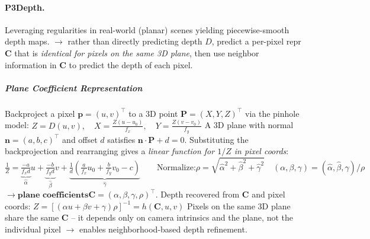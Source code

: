\documentclass{article}
\begin{document}
\paragraph{P3Depth.}
Leveraging regularities in real-world (planar) scenes yielding piecewise-smooth depth maps. $\rightarrow$ rather than directly predicting depth $D$, predict a per-pixel repr $\mathbf{C}$ that is \textit{identical for pixels on the same 3D plane}, then use neighbor information in $\mathbf{C}$ to predict the depth of each pixel.

\subparagraph{Plane Coefficient Representation}
Backproject a pixel $\mathbf{p} = (u,v)^\top$ to a 3D point $\mathbf{P} = (X,Y,Z)^\top$ via the pinhole model:
$Z = D(u,v), \quad X = \tfrac{Z(u-u_0)}{f_x}, \quad Y = \tfrac{Z(v-v_0)}{f_y}$
A 3D plane with normal $\mathbf{n} = (a,b,c)^\top$ and offset $d$ satisfies $\mathbf{n}\cdot\mathbf{P} + d = 0$. Substituting the backprojection and rearranging gives a \textit{linear function for $1/Z$ in pixel coords}:
$$\tfrac{1}{Z} = \underbrace{\tfrac{-a}{f_x d}}_{\hat\alpha} u + \underbrace{\tfrac{-b}{f_y d}}_{\hat\beta} v + \underbrace{\tfrac{1}{d}\!\left(\tfrac{a}{f_x}u_0 + \tfrac{b}{f_y}v_0 - c\right)}_{\hat\gamma}\qquad \text{Normalize:} \rho = \sqrt{\hat\alpha^2 + \hat\beta^2 + \hat\gamma^2}\quad (\alpha,\beta,\gamma) = (\hat\alpha, \hat\beta, \hat\gamma)/\rho$$ 
$\rightarrow \textbf{plane coefficients} \mathbf{C} = (\alpha, \beta, \gamma, \rho)^\top$.
Depth recovered from $\mathbf{C}$ and pixel coords:
$Z = [(\alpha u + \beta v + \gamma)\rho]^{-1} = h(\mathbf{C}, u, v)$
Pixels on the same 3D plane share the same $\mathbf{C}$ -- it depends only on camera intrinsics and the plane, not the individual pixel $\rightarrow$ enables neighborhood-based depth refinement.
\end{document}

